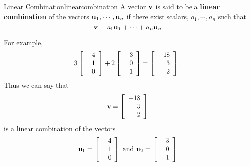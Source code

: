 \begin{definition}{Linear Combination}{linearcombination}
A vector ${\bf v}$ is said to be a \textbf{linear combination }
 of the vectors ${\bf u}_1,\cdots , {\bf u}_n $ 
if there exist scalars, $a_{1},\cdots ,a_{n}$ such
that
\begin{equation*}
{\bf v} = a_1 {\bf u}_1 + \cdots + a_n {\bf u}_n
\end{equation*}
\end{definition}

For example, 
\begin{equation*}
3
\left[
\begin{array}{r}
-4 \\
1 \\
0
\end{array}
\right]
+
2
\left[
\begin{array}{r}
-3 \\
0\\
1
\end{array}
\right]
 =
\left[
\begin{array}{r}
-18 \\
3 \\
2
\end{array}
\right]. 
\end{equation*}
Thus we can say that
\begin{equation*}
{\bf v}= \left[
\begin{array}{r}
-18 \\
3 \\
2
\end{array}
\right]
\end{equation*}
is a linear combination of the vectors 
\begin{equation*}
{\bf u}_1 = \left[
\begin{array}{r}
-4 \\
1 \\
0
\end{array}
\right]
\mbox{ and } 
{\bf u}_2 = 
\left[
\begin{array}{r}
-3 \\
0\\
1
\end{array}
\right]
\end{equation*}

